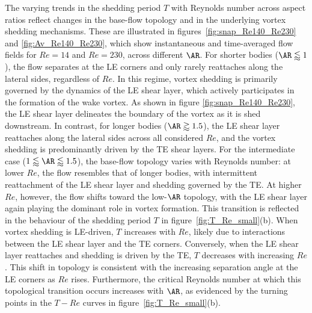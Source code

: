The varying trends in the shedding period $T$ with Reynolds number across aspect ratios reflect changes in the base-flow topology and in the underlying vortex shedding mechanisms. These are illustrated in figures~\ref{fig:snap_Re140_Re230} and \ref{fig:Av_Re140_Re230}, which show instantaneous and time-averaged flow fields for $Re=14$ and $Re=230$, across different $\AR$.
%
For shorter bodies ($\AR \lessapprox 1$), the flow separates at the LE corners and only rarely reattaches along the lateral sides, regardless of $Re$. In this regime, vortex shedding is primarily governed by the dynamics of the LE shear layer, which actively participates in the formation of the wake vortex. As shown in figure \ref{fig:snap_Re140_Re230}, the LE shear layer delineates the boundary of the vortex as it is shed downstream.
%
In contrast, for longer bodies ($\AR \gtrapprox 1.5$), the LE shear layer reattaches along the lateral sides across all considered $Re$, and the vortex shedding is predominantly driven by the TE shear layers. For the intermediate case ($1 \lessapprox \AR \lessapprox 1.5$), the base-flow topology varies with Reynolds number: at lower $Re$, the flow resembles that of longer bodies, with intermittent reattachment of the LE shear layer and shedding governed by the TE. At higher $Re$, however, the flow shifts toward the low-$\AR$ topology, with the LE shear layer again playing the dominant role in vortex formation.
%
This transition is reflected in the behaviour of the shedding period $T$ in figure~\ref{fig:T_Re_small}(b). When vortex shedding is LE-driven, $T$ increases with $Re$, likely due to interactions between the LE shear layer and the TE corners. Conversely, when the LE shear layer reattaches and shedding is driven by the TE, $T$ decreases with increasing $Re$. This shift in topology is consistent with the increasing separation angle at the LE corners as $Re$ rises. Furthermore, the critical Reynolds number at which this topological transition occurs increases with $\AR$, as evidenced by the turning points in the $T-Re$ curves in figure~\ref{fig:T_Re_small}(b).

